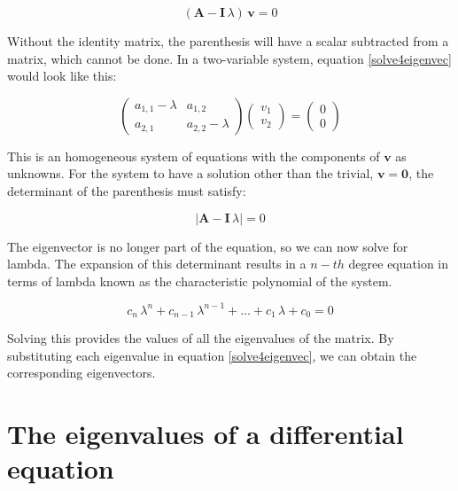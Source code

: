\documentclass{tufte-book} %
\begin{document}
\begin{equation}
	\label{solve4eigenvec}
	\left( \mathbf{A}   - \mathbf{I} \, \lambda     \right) \, \mathbf{v} =  0  
\end{equation}

Without the identity matrix, the parenthesis will have a scalar subtracted from a matrix, which cannot be done. In a two-variable system, equation \ref{solve4eigenvec} would look like this:

\begin{equation}
\begin{pmatrix} a_{1,1} - \lambda & a_{1,2}\\ a_{2,1} & a_{2,2}  - \lambda \end{pmatrix} \begin{pmatrix} v_1\\ v_2 \end{pmatrix} =  \begin{pmatrix} 0\\ 0 \end{pmatrix}\nonumber
\end{equation}

This is an homogeneous system of equations with the components of $\mathbf{v}$ as unknowns. For the system to have a solution other than the trivial, $\mathbf{v}=\mathbf{0}$, the determinant of the parenthesis must satisfy:

\begin{equation}
	\label{solve4eigenval}
	\left| \mathbf{A}   - \mathbf{I} \, \lambda     \right|  =  0  
\end{equation}

The eigenvector is no longer part of the equation, so we can now solve for lambda. The expansion of this determinant results in a $n-th$ degree equation in terms of lambda known as the characteristic polynomial of the system.

\begin{equation}
c_n \, \lambda^n +c_{n-1} \, \lambda^{n-1}  + \dots  + c_1 \, \lambda + c_0 = 0 \nonumber
\end{equation}

Solving this provides the values of all the eigenvalues of the matrix. By substituting each eigenvalue in equation \ref{solve4eigenvec}, we can obtain the corresponding eigenvectors.

\section{The eigenvalues of a differential equation} 
\end{document}
